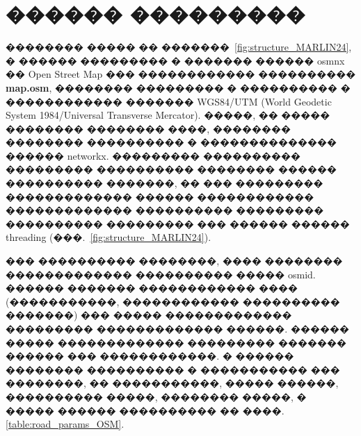 \documentclass[11pt]{ubs}
\DeclareMathOperator{\state}{\mathcal{S}}
\DeclareMathOperator{\action}{\mathcal{A}}
\begin{document}
\begin{proposition}
\begin{itemize}[itemsep=-3pt]


  \end{itemize}
\end{proposition}



\section{������ ���������}
\label{par:MARLIN24_sim}

�������� ����� �� �������~\ref{fig:structure_MARLIN24}, � ������ ���������  � ������� ������ osmnx �� Open Street Map ��� ������������ ���������� \textbf{map.osm}, �������� ��������� � ����������  � ������������ ������� WGS84/UTM (World Geodetic System 1984/Universal Transverse Mercator).  
�����, �� ����� �������� �������� ����, �������� �������� ���������� � �������������� ������ networkx\cite{networkx}.
��������� ���������� ��������� ���������� �������� ������ ���������� �������,  �� ��� ��������� ������������� ������ ������������   ������������� ���������� ��������� ���������� ��������� ��� ������ ������  threading\cite{python-threading} (���.~\ref{fig:structure_MARLIN24}).

��� ���������� ��������, ���� �������� ������������� ���������� ����� osmid. ������ ������� ������������ ���� (�����������, ������������ ���������� �������) ��� ����� ������������� ��������� ������������� ������.  ������ ����� ������������� ��������� ������� ������ ��� ������������. 
� ������ �������� ���������� � ����������� ��� ��������, �� �����������, ����� ������, ���������� �����, �������� �����, � ����� ������ ���������� �� ����. \ref{table:road_params_OSM}.
\end{document}

